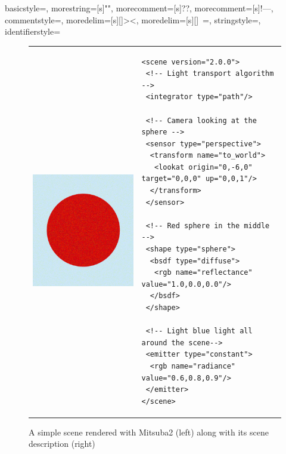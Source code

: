 {
	basicstyle=\ttfamily,
	morestring=[s]{"}{"},
	morecomment=[s]{?}{?},
	morecomment=[s]{!--}{--},
	commentstyle=\color{darkgreen},
	moredelim=[s][\color{black}]{>}{<},
	moredelim=[s][\color{red}]{\ }{=},
	stringstyle=\color{blue},
	identifierstyle=\color{maroon}
}

\begin{figure}[httpb]
\begin{tabular}{p{}p{}}
\begin{minipage}{0.3\textwidth}
	\includegraphics[width=\linewidth]{img/example_scene.png}
\end{minipage}
	&
\begin{minipage}{0.6\textwidth}
	\lstset{language=XML}
	\begin{lstlisting}[basicstyle=\tiny]
<scene version="2.0.0">
 <!-- Light transport algorithm -->
 <integrator type="path"/>
	
 <!-- Camera looking at the sphere -->
 <sensor type="perspective">
  <transform name="to_world">
   <lookat origin="0,-6,0" target="0,0,0" up="0,0,1"/>
  </transform>
 </sensor>
	
 <!-- Red sphere in the middle -->
 <shape type="sphere">
  <bsdf type="diffuse">
   <rgb name="reflectance" value="1.0,0.0,0.0"/>
  </bsdf>
 </shape>
	
 <!-- Light blue light all around the scene-->
 <emitter type="constant">
  <rgb name="radiance" value="0.6,0.8,0.9"/>
 </emitter>
</scene>
	\end{lstlisting}
\end{minipage}
\end{tabular}
\caption{A simple scene rendered with Mitsuba2 (left) along with its scene description (right)}
\label{fig:example_scene}
\end{figure}

